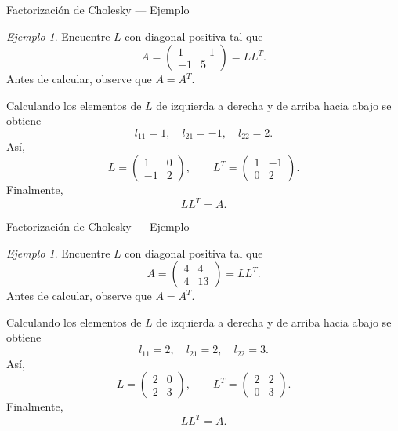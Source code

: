 \documentclass[aspectratio=169,11pt]{beamer}
\theoremstyle{remark}
\newtheorem{Ejem}[definicion]{Ejemplo}
\begin{document}
\begin{frame}[shrink=5]{Factorización de Cholesky — Ejemplo}
\footnotesize
\begin{Ejem}
Encuentre $L$ con diagonal positiva tal que
\[
A=\begin{pmatrix}1 & -1\\-1 & 5\end{pmatrix}=LL^T.
\]
Antes de calcular, observe que $A=A^T$.

Calculando los elementos de $L$ de izquierda a derecha y de arriba hacia abajo se obtiene
\[
l_{11}=1,\quad l_{21}=-1,\quad l_{22}=2.
\]
Así,
\[
L=\begin{pmatrix}1 & 0\\-1 & 2\end{pmatrix},\qquad L^T=\begin{pmatrix}1 & -1\\0 & 2\end{pmatrix}.
\]
Finalmente,
\[
\boxed{LL^T=A}.
\]
\end{Ejem}
\end{frame}

\begin{frame}[shrink=5]{Factorización de Cholesky — Ejemplo}
\footnotesize
\begin{Ejem}
Encuentre $L$ con diagonal positiva tal que
\[
A=\begin{pmatrix}4 & 4\\4 & 13\end{pmatrix}=LL^T.
\]
Antes de calcular, observe que $A=A^T$.

Calculando los elementos de $L$ de izquierda a derecha y de arriba hacia abajo se obtiene
\[
l_{11}=2,\quad l_{21}=2,\quad l_{22}=3.
\]
Así,
\[
L=\begin{pmatrix}2 & 0\\2 & 3\end{pmatrix},\qquad L^T=\begin{pmatrix}2 & 2\\0 & 3\end{pmatrix}.
\]
Finalmente,
\[
\boxed{LL^T=A}.
\]

\end{Ejem}
\end{frame}
\end{document}
